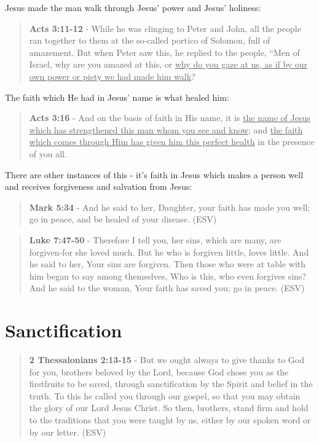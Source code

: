 \documentclass[11pt]{article}
\begin{document}
Jesus made the man walk through Jesus' power and Jesus' holiness:

\begin{quote}
\textbf{Acts 3:11-12} - While he was clinging to Peter and John, all the people ran together to them at the so-called portico of Solomon, full of amazement. But when Peter saw this, he replied to the people, “Men of Israel, why are you amazed at this, or \uline{why do you gaze at us, as if by our own power or piety we had made him walk}?
\end{quote}

The faith which He had in Jesus' name is what healed him:

\begin{quote}
\textbf{Acts 3:16} - And on the basis of faith in His name, it is \uline{the name of Jesus which has strengthened this man whom you see and know}; and \uline{the faith which comes through Him has given him this perfect health} in the presence of you all.
\end{quote}

There are other instances of this - it's faith in Jesus which makes a person well and receives forgiveness and salvation from Jesus:

\begin{quote}
\textbf{Mark 5:34} -  And he said to her, Daughter, your faith has made you well; go in peace, and be healed of your disease.  (ESV)
\end{quote}

\begin{quote}
\textbf{Luke 7:47-50} - Therefore I tell you, her sins, which are many, are forgiven-for she loved much. But he who is forgiven little, loves little. And he said to her, Your sins are forgiven. Then those who were at table with him began to say among themselves, Who is this, who even forgives sins? And he said to the woman, Your faith has saved you; go in peace. (ESV)
\end{quote}

\section{Sanctification}
\label{sec:org9becf3d}
\begin{quote}
\textbf{2 Thessalonians 2:13-15} -  But we ought always to give thanks to God for you, brothers beloved by the Lord, because God chose you as the firstfruits to be saved, through sanctification by the Spirit and belief in the truth.  To this he called you through our gospel, so that you may obtain the glory of our Lord Jesus Christ.  So then, brothers, stand firm and hold to the traditions that you were taught by us, either by our spoken word or by our letter.  (ESV)
\end{quote}
\end{document}
